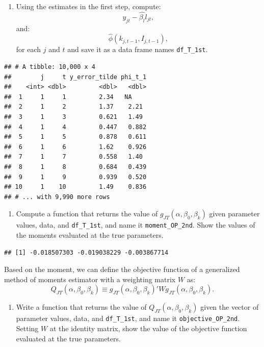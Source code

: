 \documentclass[]{book}
\providecommand{\tightlist}{%
  \setlength{\itemsep}{0pt}\setlength{\parskip}{0pt}}
\begin{document}
\begin{enumerate}
\def\labelenumi{\arabic{enumi}.}
\setcounter{enumi}{4}
\tightlist
\item
  Using the estimates in the first step, compute: \[
  y_{jt} - \hat{\beta_l} l_{jt},
  \] and: \[
  \hat{\phi}(k_{j, t - 1}, I_{j, t - 1}),
  \] for each \(j\) and \(t\) and save it as a data frame names
  \texttt{df\_T\_1st}.
\end{enumerate}

\begin{verbatim}
## # A tibble: 10,000 x 4
##        j     t y_error_tilde phi_t_1
##    <int> <dbl>         <dbl>   <dbl>
##  1     1     1         2.34   NA    
##  2     1     2         1.37    2.21 
##  3     1     3         0.621   1.49 
##  4     1     4         0.447   0.882
##  5     1     5         0.878   0.611
##  6     1     6         1.62    0.926
##  7     1     7         0.558   1.40 
##  8     1     8         0.684   0.439
##  9     1     9         0.939   0.520
## 10     1    10         1.49    0.836
## # ... with 9,990 more rows
\end{verbatim}

\begin{enumerate}
\def\labelenumi{\arabic{enumi}.}
\setcounter{enumi}{5}
\tightlist
\item
  Compute a function that returns the value of
  \(g_{JT}(\alpha, \beta_0, \beta_k)\) given parameter values, data, and
  \texttt{df\_T\_1st}, and name it \texttt{moment\_OP\_2nd}. Show the
  values of the moments evaluated at the true parameters.
\end{enumerate}

\begin{verbatim}
## [1] -0.018507303 -0.019038229 -0.003867714
\end{verbatim}

Based on the moment, we can define the objective function of a
generalized method of moments estimator with a weighting matrix \(W\)
as: \[
Q_{JT}(\alpha, \beta_0, \beta_k) \equiv g_{JT}(\alpha, \beta_0, \beta_k)' W g_{JT}(\alpha, \beta_0, \beta_k).
\]

\begin{enumerate}
\def\labelenumi{\arabic{enumi}.}
\setcounter{enumi}{6}
\tightlist
\item
  Write a function that returns the value of
  \(Q_{JT}(\alpha, \beta_0, \beta_k)\) given the vector of parameter
  values, data, and \texttt{df\_T\_1st}, and name it
  \texttt{objective\_OP\_2nd}. Setting \(W\) at the identity matrix,
  show the value of the objective function evaluated at the true
  parameters.
\end{enumerate}
\end{document}
